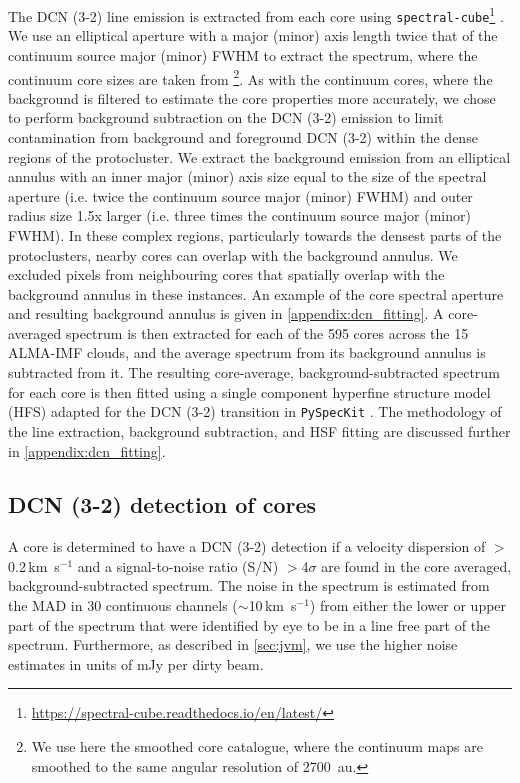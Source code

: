 \documentclass[longauth]{aa} %
\newcommand{\kms}{\textrm{km~s}\ensuremath{^{-1}}\xspace}       %
\begin{document}
 The DCN (3-2) line emission is extracted from each core using \texttt{spectral-cube}\footnote{\url{https://spectral-cube.readthedocs.io/en/latest/}} \citep{Ginsburg2019b}. We use an elliptical aperture with a major (minor) axis length twice that of the continuum source major (minor) FWHM to extract the spectrum, where the continuum core sizes are taken from \cite{louvet22}\footnote{We use here the smoothed core catalogue, where the continuum maps are smoothed to the same angular resolution of 2700~au.}. As with the continuum cores, where the background is filtered to estimate the core properties more accurately, we chose to perform background subtraction on the DCN (3-2) emission to limit contamination from background and foreground DCN (3-2) within the dense regions of the protocluster. 
 We extract the background emission from an elliptical annulus with an inner major (minor) axis size equal to the size of the spectral aperture (i.e. twice the continuum source major (minor) FWHM) and outer radius size 1.5x larger (i.e. three times the continuum source major (minor) FWHM). In these complex regions, particularly towards the densest parts of the protoclusters, nearby cores can overlap with the background annulus. We excluded pixels from neighbouring cores that spatially overlap with the background annulus in these instances. An example of the core spectral aperture and resulting background annulus is given in \cref{appendix:dcn_fitting}. A core-averaged spectrum is then extracted for each of the 595 cores across the 15 ALMA-IMF clouds, and the average spectrum from its background annulus is subtracted from it. The resulting core-average, background-subtracted spectrum for each core is then fitted using a single component hyperfine structure model (HFS) adapted for the DCN (3-2) transition in \texttt{PySpecKit} \citep{Ginsburg2011}. The methodology of the line extraction, background subtraction, and HSF fitting are discussed further in \cref{appendix:dcn_fitting}. 


\subsection{DCN (3-2) detection of cores}
\label{line_fitting_complex}
A core is determined to have a DCN (3-2) detection if a velocity dispersion of $>$0.2\,\kms and a signal-to-noise ratio (S/N) $>$4$\sigma$ are found in the core averaged, background-subtracted spectrum. The noise in the spectrum is estimated from the MAD in 30 continuous channels ($\sim$10\,\kms) from either the lower or upper part of the spectrum that were identified by eye to be in a line free part of the spectrum. Furthermore, as described in \cref{sec:jvm}, we use the higher noise estimates in units of mJy per dirty beam. 
\end{document}
